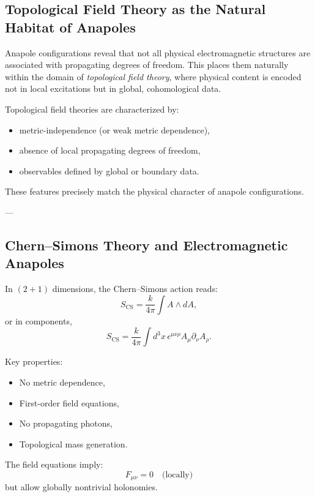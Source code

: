 \documentclass[11pt]{article}
\begin{document}
\subsection{Topological Field Theory as the Natural Habitat of Anapoles}

Anapole configurations reveal that not all physical electromagnetic structures are associated with propagating degrees of freedom. This places them naturally within the domain of \emph{topological field theory}, where physical content is encoded not in local excitations but in global, cohomological data.

Topological field theories are characterized by:
\begin{itemize}
\item metric-independence (or weak metric dependence),
\item absence of local propagating degrees of freedom,
\item observables defined by global or boundary data.
\end{itemize}

These features precisely match the physical character of anapole configurations.

---

\subsection{Chern--Simons Theory and Electromagnetic Anapoles}

In $(2+1)$ dimensions, the Chern--Simons action reads:
\begin{equation}
S_{\text{CS}} = \frac{k}{4\pi} \int A \wedge dA ,
\end{equation}
or in components,
\begin{equation}
S_{\text{CS}} = \frac{k}{4\pi} \int d^3x\, \epsilon^{\mu\nu\rho} A_\mu \partial_\nu A_\rho.
\end{equation}

Key properties:
\begin{itemize}
\item No metric dependence,
\item First-order field equations,
\item No propagating photons,
\item Topological mass generation.
\end{itemize}

The field equations imply:
\[
F_{\mu\nu} = 0 \quad \text{(locally)}
\]
but allow globally nontrivial holonomies.
\end{document}
